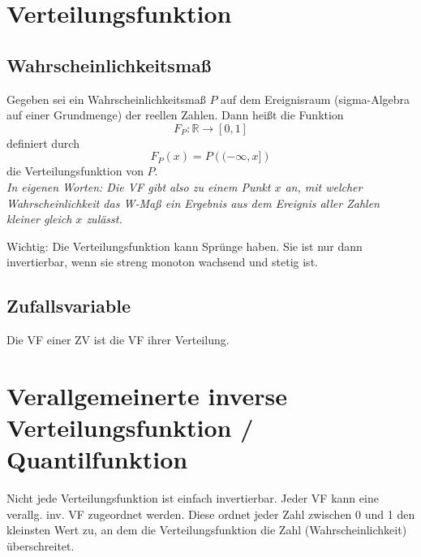 \documentclass[paper=a4,10pt]{scrartcl}
\begin{document}


\section{Verteilungsfunktion}
\subsection{Wahrscheinlichkeitsmaß}
Gegeben sei ein Wahrscheinlichkeitsmaß $P$ auf dem Ereignisraum (sigma-Algebra auf einer Grundmenge) der reellen Zahlen. Dann heißt die Funktion 
\begin{equation*}
F_P: \mathbb{R} \rightarrow [0,1]
\end{equation*}
definiert durch
\begin{equation*}
F_P(x) = P\left( (-\infty, x]  \right)
\end{equation*}
die Verteilungsfunktion von $P$. \\

\noindent
\textit{In eigenen Worten: Die VF gibt also zu einem Punkt $x$ an, mit welcher Wahrscheinlichkeit das W-Maß ein Ergebnis aus dem Ereignis aller Zahlen kleiner gleich $x$ zulässt.}

Wichtig: Die Verteilungsfunktion kann Sprünge haben. Sie ist nur dann invertierbar, wenn sie streng monoton wachsend und stetig ist.

\subsection{Zufallsvariable}
Die VF einer ZV ist die VF ihrer Verteilung.

\section{Verallgemeinerte inverse Verteilungsfunktion / Quantilfunktion}
Nicht jede Verteilungsfunktion ist einfach invertierbar. Jeder VF kann eine verallg. inv. VF zugeordnet werden. Diese ordnet jeder Zahl zwischen 0 und 1 den kleinsten Wert zu, an dem die Verteilungsfunktion die Zahl (Wahrscheinlichkeit) überschreitet.\\
\end{document}
